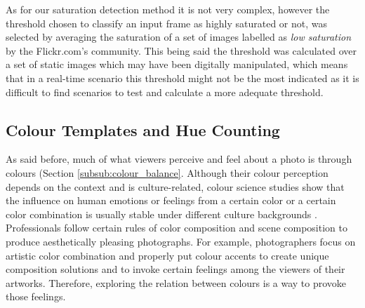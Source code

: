 As for our saturation detection method it is not very complex, however the threshold chosen to classify an input frame as highly saturated or not, was selected by averaging the saturation of a set of images labelled as \emph{low saturation} by the Flickr.com's community. This being said the threshold was calculated over a set of static images which may have been digitally manipulated, which means that in a real-time scenario this threshold might not be the most indicated as it is difficult to find scenarios to test and calculate a more adequate threshold.

\subsection{Colour Templates and Hue Counting}
\label{sub:colour}

As said before, much of what viewers perceive and feel about a photo is through colours (Section \ref{subsub:colour_balance}. Although their colour perception depends on the context and is culture-related, colour science studies show that the influence on human emotions or feelings from a certain color or a certain color combination is usually stable under different culture backgrounds \cite{manav2007color}.
Professionals follow certain rules of color composition and scene composition to produce aesthetically pleasing photographs. For example, photographers focus on artistic color combination and properly put colour accents to create unique composition solutions and to invoke certain feelings among the viewers of their artworks. Therefore, exploring the relation between colours is a way to provoke those feelings.

